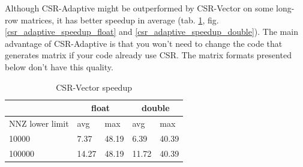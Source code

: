 \documentclass{article}
\begin{document}
Although CSR-Adaptive might be outperformed by CSR-Vector on some long-row matrices, it has better speedup in average (tab. \ref{csr_vector_speedup_table}, 
fig. \ref{csr_adaptive_speedup_float} and \ref{csr_adaptive_speedup_double}). The main advantage of CSR-Adaptive is that you won't need to change
the code that generates matrix if your code already use CSR. The matrix formats presented below don't have this quality.

\begin{table}[H]
	\centering
	\begin{tabular}{ |p{2.6cm}||p{1cm}|p{1cm}|p{1cm}|p{1cm}|  }
	 \hline
		& \multicolumn{2}{|c|}{float} & \multicolumn{2}{|c|}{double}\\
	 \hline
	 NNZ lower limit & avg & max & avg & max  \\
	 \hline
	 10000  & 7.37  & 48.19 & 6.39 & 40.39 \\
	 100000 & 14.27 & 48.19 & 11.72 & 40.39 \\
	 \hline
	\end{tabular}
	\caption{CSR-Vector speedup}
  \label{csr_vector_speedup_table}
\end{table}

\begin{figure}[H]
\centering
{}
\qquad %
\end{figure}
\end{document}
